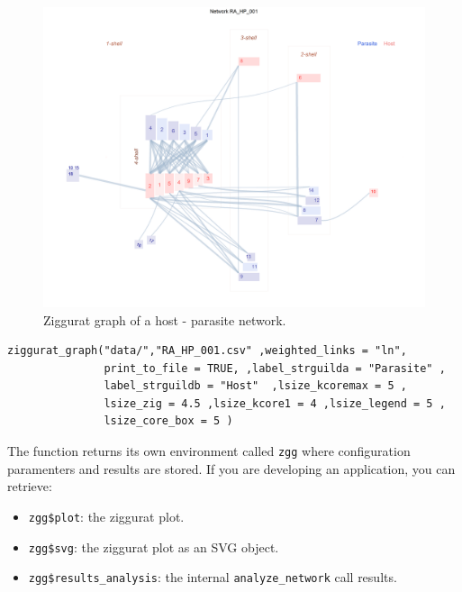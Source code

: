 \documentclass[11pt]{article}
\begin{document}
\begin{figure}[hp!]
\centering
\includegraphics[scale=0.4]{RA_HP_001_ziggurat.png}
\caption {Ziggurat graph of a host - parasite network.}
\label{fig:RA_HP_001-ziggurat}
\end{figure}

\fontsize{3.5mm}{3.5mm}\selectfont
\begin{verbatim}
ziggurat_graph("data/","RA_HP_001.csv" ,weighted_links = "ln", 
               print_to_file = TRUE, ,label_strguilda = "Parasite" ,
               label_strguildb = "Host"  ,lsize_kcoremax = 5 ,               
               lsize_zig = 4.5 ,lsize_kcore1 = 4 ,lsize_legend = 5 ,
               lsize_core_box = 5 )

\end{verbatim}
\normalsize



\clearpage

\noindent The function returns its own environment called \texttt{zgg} where configuration paramenters and results
are stored. If you are developing an application, you can retrieve:

\begin{itemize}

\item \texttt{zgg\$plot}:  the ziggurat plot.

\item \texttt{zgg\$svg}: the ziggurat plot as an SVG object.

\item \texttt{zgg\$results\_analysis}: the internal \texttt{analyze\_network} call results.

\end{itemize}
 
\end{document}
